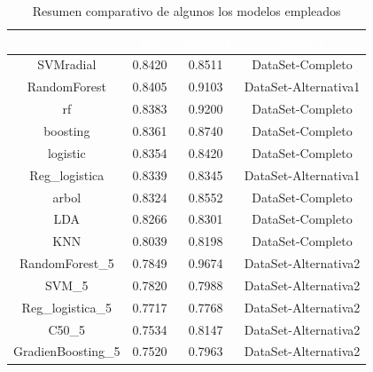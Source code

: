 \begin{table}[!h]
	
	\caption{\label{tab:cuadro_comparativo-modelos}Resumen comparativo de algunos los modelos empleados}
	\centering
	\begin{tabular}[t]{cccc}
		\toprule
		\rowcolor{black}  \multicolumn{1}{c}{\textcolor{white}{\textbf{object}}} & \multicolumn{1}{c}{\textcolor{white}{\textbf{Test}}} & \multicolumn{1}{c}{\textcolor{white}{\textbf{Training}}} & \multicolumn{1}{c}{\textcolor{white}{\textbf{dataset}}}\\
		\midrule
		\rowcolor{gray!6}  SVMradial & 0.8420 & 0.8511 & DataSet-Completo\\
		RandomForest & 0.8405 & 0.9103 & DataSet-Alternativa1\\
		\rowcolor{gray!6}  rf & 0.8383 & 0.9200 & DataSet-Completo\\
		boosting & 0.8361 & 0.8740 & DataSet-Completo\\
		\rowcolor{gray!6}  logistic & 0.8354 & 0.8420 & DataSet-Completo\\
		\addlinespace
		Reg\_logistica & 0.8339 & 0.8345 & DataSet-Alternativa1\\
		\rowcolor{gray!6}  arbol & 0.8324 & 0.8552 & DataSet-Completo\\
		LDA & 0.8266 & 0.8301 & DataSet-Completo\\
		\rowcolor{gray!6}  KNN & 0.8039 & 0.8198 & DataSet-Completo\\
		RandomForest\_5 & 0.7849 & 0.9674 & DataSet-Alternativa2\\
		\addlinespace
		\rowcolor{gray!6}  SVM\_5 & 0.7820 & 0.7988 & DataSet-Alternativa2\\
		Reg\_logistica\_5 & 0.7717 & 0.7768 & DataSet-Alternativa2\\
		\rowcolor{gray!6}  C50\_5 & 0.7534 & 0.8147 & DataSet-Alternativa2\\
		GradienBoosting\_5 & 0.7520 & 0.7963 & DataSet-Alternativa2\\
		\bottomrule
	\end{tabular}
\end{table}


